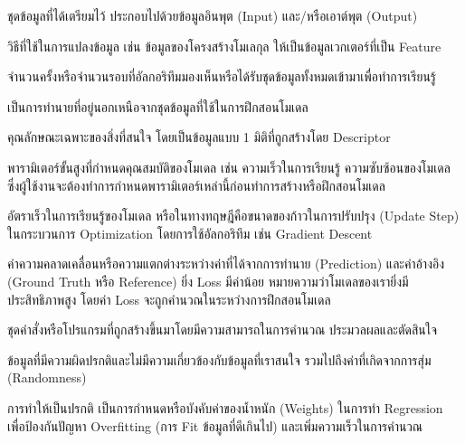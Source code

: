 \begin{description}[style=nextline]
    \item[Data Set หรือ Dataset] ชุดข้อมูลที่ได้เตรียมไว้ ประกอบไปด้วยข้อมูลอินพุต (Input) และ/หรือเอาต์พุต (Output)

    \item[Descriptor] วิธีที่ใช้ในการแปลงข้อมูล เช่น ข้อมูลของโครงสร้างโมเลกุล ให้เป็นข้อมูลเวกเตอร์ที่เป็น Feature

    \item[Epoch] จำนวนครั้งหรือจำนวนรอบที่อัลกอริทึมมองเห็นหรือได้รับชุดข้อมูลทั้งหมดเข้ามาเพื่อทำการเรียนรู้

    \item[Extrapolation] เป็นการทำนายที่อยู่นอกเหนือจากชุดข้อมูลที่ใช้ในการฝึกสอนโมเดล

    \item[Feature] คุณลักษณะเฉพาะของสิ่งที่สนใจ โดยเป็นข้อมูลแบบ 1 มิติที่ถูกสร้างโดย Descriptor

    \item[Hyperparameter] พารามิเตอร์ขั้นสูงที่กำหนดคุณสมบัติของโมเดล เช่น ความเร็วในการเรียนรู้ ความซับซ้อนของโมเดล
    ซึ่งผู้ใช้งานจะต้องทำการกำหนดพารามิเตอร์เหล่านี้ก่อนทำการสร้างหรือฝึกสอนโมเดล

    \item[Learning Rate] อัตราเร็วในการเรียนรู้ของโมเดล หรือในทางทฤษฎีคือขนาดของก้าวในการปรับปรุง (Update Step) ในกระบวนการ 
    Optimization โดยการใช้อัลกอริทึม เช่น Gradient Descent

    \item[Loss] ค่าความคลาดเคลื่อนหรือความแตกต่างระหว่างค่าที่ได้จากการทำนาย (Prediction) และค่าอ้างอิง (Ground Truth หรือ 
    Reference) ยิ่ง Loss มีค่าน้อย หมายความว่าโมเดลของเรายิ่งมีประสิทธิภาพสูง โดยค่า Loss จะถูกคำนวณในระหว่างการฝึกสอนโมเดล

    \item[Model] ชุดคำสั่งหรือโปรแกรมที่ถูกสร้างขึ้นมาโดยมีความสามารถในการคำนวณ ประมวลผลและตัดสินใจ

    \item[Noise] ข้อมูลที่มีความผิดปรกติและไม่มีความเกี่ยวข้องกับข้อมูลที่เราสนใจ รวมไปถึงค่าที่เกิดจากการสุ่ม (Randomness)

    \item[Normalization] การทำให้เป็นปรกติ เป็นการกำหนดหรือบังคับค่าของน้ำหนัก (Weights) ในการทำ Regression เพื่อป้องกันปัญหา
    Overfitting (การ Fit ข้อมูลที่ดีเกินไป) และเพิ่มความเร็วในการคำนวณ


\end{description}
